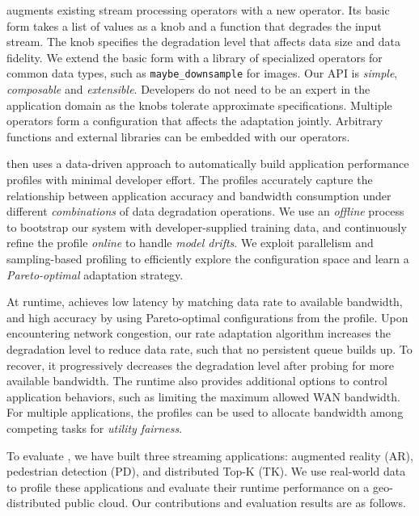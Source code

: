 \sysname{} augments existing stream processing operators with a new \maybe{}
operator. Its basic form takes a list of values as a knob and a function that
degrades the input stream. The knob specifies the degradation level that affects
data size and data fidelity. We extend the basic form with a library of
specialized operators for common data types, such as \texttt{maybe\_downsample}
for images. Our API is \textit{simple}, \textit{composable} and
\textit{extensible}. Developers do not need to be an expert in the application
domain as the knobs tolerate approximate specifications. Multiple operators form
a configuration that affects the adaptation jointly. Arbitrary functions and
external libraries can be embedded with our operators.

\sysname{} then uses a data-driven approach to automatically build application
performance profiles with minimal developer effort. The profiles accurately
capture the relationship between application accuracy and bandwidth consumption
under different \textit{combinations} of data degradation operations. We use an
\textit{offline} process to bootstrap our system with developer-supplied
training data, and continuously refine the profile \textit{online} to handle
\textit{model drifts}. We exploit parallelism and sampling-based profiling to
efficiently explore the configuration space and learn a \textit{Pareto-optimal}
adaptation strategy.

At runtime, \sysname{} achieves low latency by matching data rate to available
bandwidth, and high accuracy by using Pareto-optimal configurations from the
profile. Upon encountering network congestion, our rate adaptation algorithm
increases the degradation level to reduce data rate, such that no persistent
queue builds up. To recover, it progressively decreases the degradation level
after probing for more available bandwidth. The runtime also provides additional
options to control application behaviors, such as limiting the maximum allowed
WAN bandwidth. For multiple applications, the profiles can be used to allocate
bandwidth among competing tasks for \textit{utility fairness}.

To evaluate \sysname{}, we have built three streaming applications: augmented
reality (AR), pedestrian detection (PD), and distributed Top-K (TK). We use
real-world data to profile these applications and evaluate their runtime
performance on a geo-distributed public cloud. Our contributions and evaluation
results are as follows.

